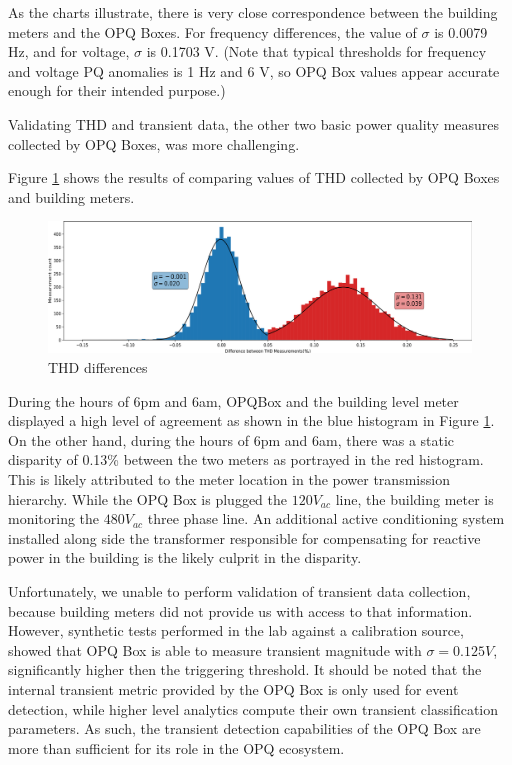 As the charts illustrate, there is very close correspondence between the building meters and the OPQ Boxes. For frequency differences, the value of $\sigma$ is 0.0079 Hz, and for voltage, $\sigma$ is 0.1703 V. (Note that typical thresholds for frequency and voltage PQ anomalies is 1 Hz and 6 V, so OPQ Box values appear accurate enough for their intended purpose.)

Validating THD and transient data, the other two basic power quality measures collected by OPQ Boxes, was more challenging.

Figure \ref{fig:opqbox-thd-validation} shows the results of comparing values of THD collected by OPQ Boxes and building meters.

\begin{figure}[ht]
  \centering
	\includegraphics[width=0.8\linewidth]{images/pilot/opqbox-thd-validation.png}
	\caption{THD differences}
	\label{fig:opqbox-thd-validation}
\end{figure}

During the hours of 6pm and 6am, OPQBox and the building level meter displayed a high level of agreement as shown in the blue histogram in Figure \ref{fig:opqbox-thd-validation}.
On the other hand, during the hours of 6pm and 6am, there was a static disparity of 0.13\% between the two meters as portrayed  in the red histogram.
This is likely attributed to the meter location in the power transmission hierarchy.
While the OPQ Box is plugged the $120V_{ac}$ line, the building meter is monitoring the $480V_{ac}$ three phase line.
An additional active conditioning system installed along side the transformer responsible for compensating for reactive power in the building is the likely culprit in the disparity.

Unfortunately, we unable to perform validation of transient data collection, because building meters did not provide us with access to that information.
However, synthetic tests performed in the lab against a calibration source, showed that OPQ Box is able to measure transient magnitude with $\sigma=0.125V$, significantly higher then the triggering threshold.
It should be noted that the internal transient metric provided by the OPQ Box is only used for event detection, while higher level analytics compute their own transient classification parameters.
As such, the transient detection capabilities of the OPQ Box are more than sufficient for its role in the OPQ ecosystem.

